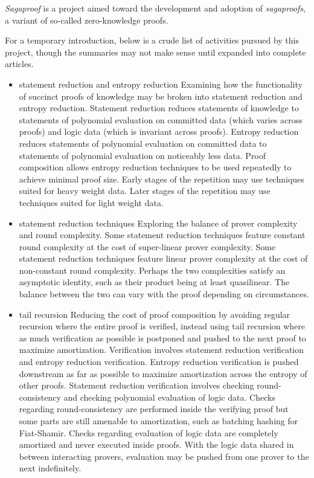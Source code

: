 
\emph{Sagaproof} is a project aimed toward the development and adoption of \emph{sagaproofs}, a variant of so-called zero-knowledge proofs.

For a temporary introduction, below is a crude list of activities pursued by this project, though the summaries may not make sense until expanded into complete articles.

\begin{itemize}

    \item{statement reduction and entropy reduction}
    Examining how the functionality of succinct proofs of knowledge may be broken into statement reduction and entropy reduction.
    Statement reduction reduces statements of knowledge to statements of polynomial evaluation on committed data (which varies across proofs) and logic data (which is invariant across proofs).
    Entropy reduction reduces statements of polynomial evaluation on committed data to statements of polynomial evaluation on noticeably less data.
    Proof composition allows entropy reduction techniques to be used repeatedly to achieve minimal proof size.
    Early stages of the repetition may use techniques suited for heavy weight data.
    Later stages of the repetition may use techniques suited for light weight data.

    \item{statement reduction techniques}
    Exploring the balance of prover complexity and round complexity.
    Some statement reduction techniques feature constant round complexity at the cost of super-linear prover complexity.
    Some statement reduction techniques feature linear prover complexity at the cost of non-constant round complexity.
    Perhaps the two complexities satisfy an asymptotic identity, such as their product being at least quasilinear.
    The balance between the two can vary with the proof depending on circumstances.

    \item{tail recursion}
    Reducing the cost of proof composition by avoiding regular recursion where the entire proof is verified, instead using tail recursion where as much verification as possible is postponed and pushed to the next proof to maximize amortization.
    Verification involves statement reduction verification and entropy reduction verification. 
    Entropy reduction verification is pushed downstream as far as possible to maximize amortization across the entropy of other proofs.
    Statement reduction verification involves checking round-consistency and checking polynomial evaluation of logic data.
    Checks regarding round-consistency are performed inside the verifying proof but some parts are still amenable to amortization, such as batching hashing for Fiat-Shamir.
    Checks regarding evaluation of logic data are completely amortized and never executed inside proofs.
    With the logic data shared in between interacting provers, evaluation may be pushed from one prover to the next indefinitely.


\end{itemize}
